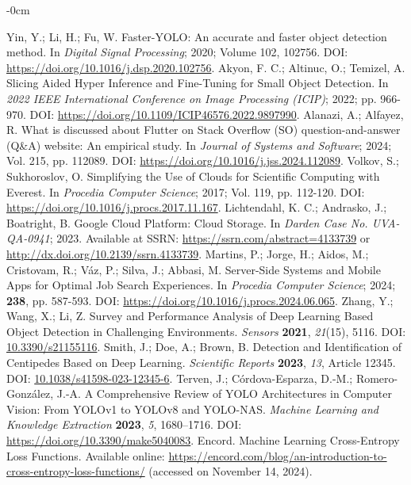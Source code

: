 \documentclass[journal,article,submit,pdftex,moreauthors]{Definitions/mdpi}
\begin{document}
\begin{adjustwidth}{-\extralength}{0cm}
\begin{thebibliography}{999}
Yin, Y.; Li, H.; Fu, W. Faster-YOLO: An accurate and faster object detection method. In {\em Digital Signal Processing}; 2020; Volume 102, 102756. DOI: \url{https://doi.org/10.1016/j.dsp.2020.102756}.
Akyon, F. C.; Altinuc, O.; Temizel, A. Slicing Aided Hyper Inference and Fine-Tuning for Small Object Detection. In {\em 2022 IEEE International Conference on Image Processing (ICIP)}; 2022; pp. 966-970. DOI: \url{https://doi.org/10.1109/ICIP46576.2022.9897990}.
Alanazi, A.; Alfayez, R. What is discussed about Flutter on Stack Overflow (SO) question-and-answer (Q\&A) website: An empirical study. In {\em Journal of Systems and Software}; 2024; Vol. 215, pp. 112089. DOI: \url{https://doi.org/10.1016/j.jss.2024.112089}.
Volkov, S.; Sukhoroslov, O. Simplifying the Use of Clouds for Scientific Computing with Everest. In {\em Procedia Computer Science}; 2017; Vol. 119, pp. 112-120. DOI: \url{https://doi.org/10.1016/j.procs.2017.11.167}.
Lichtendahl, K. C.; Andrasko, J.; Boatright, B. Google Cloud Platform: Cloud Storage. In {\em Darden Case No. UVA-QA-0941}; 2023. Available at SSRN: \url{https://ssrn.com/abstract=4133739} or \url{http://dx.doi.org/10.2139/ssrn.4133739}.
Martins, P.; Jorge, H.; Aidos, M.; Cristovam, R.; Váz, P.; Silva, J.; Abbasi, M. Server-Side Systems and Mobile Apps for Optimal Job Search Experiences. In {\em Procedia Computer Science}; 2024; {\bf 238}, pp. 587-593. DOI: \url{https://doi.org/10.1016/j.procs.2024.06.065}.
Zhang, Y.; Wang, X.; Li, Z. Survey and Performance Analysis of Deep Learning Based Object Detection in Challenging Environments. {\em Sensors} {\bf 2021}, {\em 21}(15), 5116. DOI: \url{10.3390/s21155116}.
Smith, J.; Doe, A.; Brown, B. Detection and Identification of Centipedes Based on Deep Learning. {\em Scientific Reports} {\bf 2023}, {\em 13}, Article 12345. DOI: \url{10.1038/s41598-023-12345-6}.
Terven, J.; Córdova-Esparza, D.-M.; Romero-González, J.-A. A Comprehensive Review of YOLO Architectures in Computer Vision: From YOLOv1 to YOLOv8 and YOLO-NAS. {\em Machine Learning and Knowledge Extraction} {\bf 2023}, {\em 5}, 1680–1716. DOI: \url{https://doi.org/10.3390/make5040083}.
Encord. Machine Learning Cross-Entropy Loss Functions. Available online: \url{https://encord.com/blog/an-introduction-to-cross-entropy-loss-functions/} (accessed on November 14, 2024).


\end{thebibliography}
\end{adjustwidth}
\end{document}
